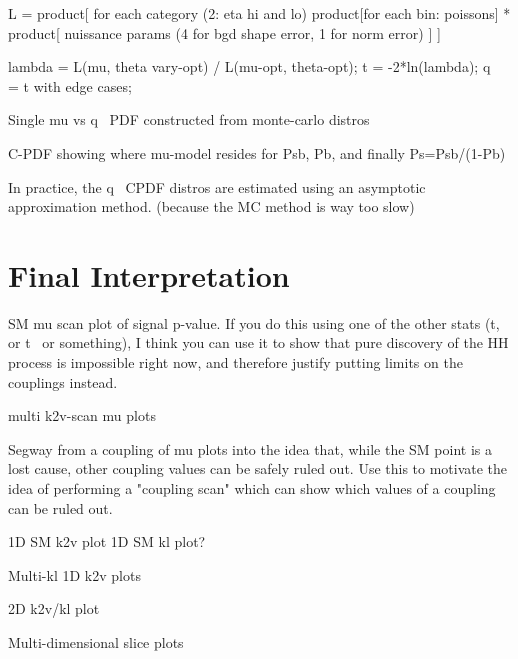         L = product[ for each category (2: eta hi and lo) 
            product[for each bin: poissons]
            * product[ nuissance params (4 for bgd shape error, 1 for norm error) ] 
        ]
        
    lambda = L(mu, theta vary-opt) / L(mu-opt, theta-opt);
    t = -2*ln(lambda);
    q~ = t with edge cases;

    Single mu vs q~ PDF constructed from monte-carlo distros

    C-PDF showing where mu-model resides for Psb, Pb, and finally Ps=Psb/(1-Pb)

    In practice, the q~ CPDF distros are estimated using an asymptotic approximation method\cite{asymptotic_formulae_for_likelihood}.
    (because the MC method is way too slow)

    

\FloatBarrier
\section{Final Interpretation}

SM mu scan plot of signal p-value.
If you do this using one of the other stats (t, or t~ or something),
    I think you can use it to show that pure discovery of the HH process is impossible right now,
    and therefore justify putting limits on the couplings instead.

multi k2v-scan mu plots

Segway from a coupling of mu plots into the idea that, while the SM point is a lost cause,
    other coupling values can be safely ruled out.
Use this to motivate the idea of performing a "coupling scan"
    which can show which values of a coupling can be ruled out.

1D SM k2v plot
1D SM kl plot?

Multi-kl 1D k2v plots

2D k2v/kl plot

Multi-dimensional slice plots
